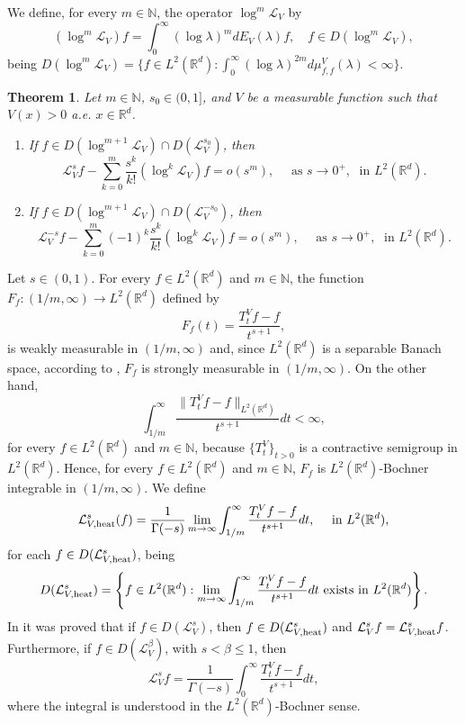 \documentclass[10pt, a4paper, reqno]{amsart}
\newtheorem{thm}{Theorem}[section]
\theoremstyle{definition}
\theoremstyle{remark}
\numberwithin{equation}{section}
\begin{document}
We define, for every $m\in \mathbb N$, the operator $\log^m\mathcal L_V$ by
\[
(\log^m\mathcal L_V)f= \int_0^\infty (\log \lambda )^mdE_V(\lambda )f,\quad f\in D(\log^m\mathcal L_V),
\]
being $D(\log^m\mathcal L_V)=\{f\in L^2(\mathbb R^d): \int_0^\infty (\log \lambda )^{2m}d\mu _{f,f}^V(\lambda )<\infty \}$.

\begin{thm}\label{Th1.1}
Let $m\in \mathbb N$, $s_0\in (0,1]$, and $V$ be a measurable function such that $V(x)>0$ a.e. $x\in\mathbb R^d$.
\begin{enumerate}[label=\textnormal{(\alph*)}]
    \item \label{itm: Th1.1-a} If $f\in D(\log^{m+1}\mathcal L_V)\cap D(\mathcal L_V^{s_0})$, then 
\[
\mathcal L_V^sf-\sum_{k=0}^m\frac{s^k}{k!}(\log^k\mathcal L_V)f=o(s^m),\quad \mbox{ as }s\rightarrow 0^+,\;\mbox{ in }L^2(\mathbb R^d).
\]
\item \label{itm: Th1.1-b} If $f\in D(\log ^{m+1} \mathcal L_V)\cap D(\mathcal L_V^{-s_0})$, then
\[
\mathcal L_V^{-s}f-\sum_{k=0}^m(-1)^k\frac{s^k}{k!}(\log^k\mathcal L_V)f=o(s^m),\quad \mbox{ as }s\rightarrow 0^+,\; \mbox{ in }L^2(\mathbb R^d).
\]
\end{enumerate}
\end{thm}


Let $s\in (0,1)$. For every $f\in L^2 (\mathbb R^d)$ and $m\in \mathbb N$, the function $F_f: (1/m,\infty)\rightarrow L^2(\mathbb R^d)$ defined by
\[
F_f(t)=\frac{T_t^Vf-f}{t^{s+1}},
\]
is weakly measurable in $(1/m,\infty)$ and, since $L^2(\mathbb R^d)$ is a separable Banach space, according to \cite[Ch.~V, \S4, Theorem,  p.~131]{Yo}, $F_f$ is strongly measurable in $(1/m,\infty)$. On the other hand, 
\[
\int_{1/m}^\infty\frac{\|T_t^Vf-f\|_{L^2(\mathbb R^d)}}{t^{s+1}}dt<\infty,
\]
for every $f\in L^2(\mathbb R^d)$ and $m\in \mathbb N$, because $\{T_t^V\}_{t>0}$ is a contractive semigroup in $L^2(\mathbb R^d)$. Hence, for every $f\in L^2 (\mathbb R^d)$ and $m\in \mathbb N$, $F_f$ is $L^2(\mathbb R^d)$-Bochner integrable in $(1/m,\infty)$. We define
\[
\mathcal L_{V,\textup{heat}}^s(f)=\frac{1}{\Gamma (-s)}\lim_{m\rightarrow \infty}\int_{1/m}^\infty\frac{T_t^Vf-f}{t^{s+1}}dt,\quad \mbox{ in }L^2(\mathbb R^d),
\]
for each $f\in D(\mathcal L_{V,\textup{heat}}^s)$, being
\[
D(\mathcal L_{V,\textup{heat}}^s)=\left\{f\in L^2 (\mathbb R^d): \lim_{m\rightarrow \infty}\int_{1/m}^\infty\frac{T_t^Vf-f}{t^{s+1}}dt\mbox{ exists in }L^2(\mathbb R^d)\right\}.
\]
In \cite[Proposition 2.4]{BDFQ} it was proved that if $f\in D(\mathcal L_V^s)$, then $f\in D(\mathcal L_{V,\textup{heat}}^s)$ and $\mathcal L_V^sf=\mathcal L_{V,\textup{heat}}^sf$. Furthermore, if $f\in D(\mathcal L_V^\beta)$, with $s<\beta \leq 1$, then
\[
\mathcal L_V^sf=\frac{1}{\Gamma (-s)}\int_0^\infty \frac{T_t^Vf-f}{t^{s+1}}dt,
\]
where the integral is understood in the $L^2(\mathbb R^d)$-Bochner sense.
\end{document}
